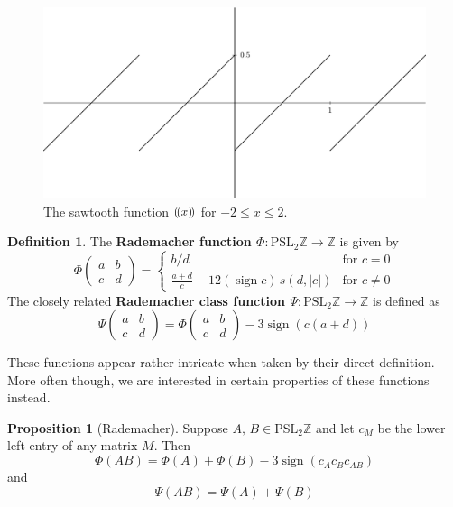 \documentclass[12pt,twoside]{reedthesis}
\theoremstyle{definition}
\newtheorem{defn}[thm]{Definition}
\newtheorem{prop}[thm]{Proposition}
\newcommand{\Z}{\mathbb{Z}}
\newcommand{\PSLZ}{\mathrm{PSL}_2{\Z}}
\DeclareMathOperator{\sign}{sign}
\newcommand{\defnphrase}[1]{\textbf{#1}}
\DeclarePairedDelimiter\sawtooth{( \! (}{) \! )}
\begin{document}
\begin{figure}[h]
  \centering
  \includegraphics[width=0.8\linewidth]{figures/sawtooth.pdf}
  \caption{The sawtooth function $\sawtooth{x}$ for $-2 \leq x \leq 2$.}
  \label{fig:sawtooth}
\end{figure}

\begin{defn}
  The \defnphrase{Rademacher function $\Phi : \PSLZ \to \Z$} is given by
  \begin{equation*}
    \Phi \begin{pmatrix}
      a & b \\
      c & d
    \end{pmatrix} = \begin{cases}
    b/d & \text{for $c = 0$} \\
    \frac{a + d}{c} - 12 (\sign c)\, s(d, |c|) & \text{for $c \neq 0$}
    \end{cases}
  \end{equation*}
  The closely related \defnphrase{Rademacher class function $\Psi : \PSLZ \to \Z$} is defined as
  \begin{equation*}
    \Psi \begin{pmatrix}
      a & b \\ c & d
    \end{pmatrix} = \Phi \begin{pmatrix}
      a & b \\ c & d
    \end{pmatrix} - 3 \sign(c(a + d))
  \end{equation*}
\end{defn}

These functions appear rather intricate when taken by their direct definition. More often though, we are interested in certain properties of these functions instead.

\begin{prop}[Rademacher]
 Suppose $A,\, B \in \PSLZ$ and let $c_M$ be the lower left entry of any matrix $M$.
 Then
 \begin{equation*}
   \Phi(AB) = \Phi(A) + \Phi(B) - 3 \sign(c_A c_B c_{AB})
 \end{equation*}
 and
 \begin{equation*}
   \Psi(AB) = \Psi(A) + \Psi(B)
 \end{equation*}
\end{prop}
\end{document}
